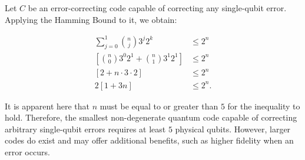 \begin{example}
  Let $C$ be an error-correcting code capable of correcting any single-qubit error. Applying the Hamming Bound to it, we obtain:

  \begin{align*}
    \sum_{j = 0}^1 \binom{n}{j} 3^j 2^k &\leq 2^n\\
    \left[\binom{n}{0} 3^0 2^1 + \binom{n}{1} 3^1 2^1\right]  &\leq 2^n\\
    \left[2 + n \cdot 3 \cdot 2\right]  &\leq 2^n\\
    2\left[1 + 3n \right]  &\leq 2^n
  .\end{align*}

  It is apparent here that $n$ must be equal to or greater than $5$ for the inequality to hold. Therefore, the smallest non-degenerate quantum code capable of correcting arbitrary single-qubit errors requires at least $5$ physical qubits. However, larger codes do exist and may offer additional benefits, such as higher fidelity when an error occurs.
\end{example}

